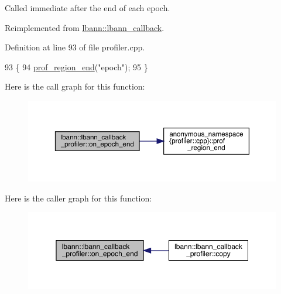 Called immediate after the end of each epoch. 

Reimplemented from \hyperlink{classlbann_1_1lbann__callback_a1fc71110e7f754bf73c9e0f344a448a5}{lbann\+::lbann\+\_\+callback}.



Definition at line 93 of file profiler.\+cpp.


\begin{DoxyCode}
93                                                    \{
94   \hyperlink{namespaceanonymous__namespace_02profiler_8cpp_03_a7984c26fb186307873a2f83f91715a99}{prof\_region\_end}(\textcolor{stringliteral}{"epoch"});
95 \}
\end{DoxyCode}
Here is the call graph for this function\+:\nopagebreak
\begin{figure}[H]
\begin{center}
\leavevmode
\includegraphics[width=350pt]{classlbann_1_1lbann__callback__profiler_a86e0fbe550ff42660766977604d9d5a6_cgraph}
\end{center}
\end{figure}
Here is the caller graph for this function\+:\nopagebreak
\begin{figure}[H]
\begin{center}
\leavevmode
\includegraphics[width=350pt]{classlbann_1_1lbann__callback__profiler_a86e0fbe550ff42660766977604d9d5a6_icgraph}
\end{center}
\end{figure}
\mbox{\label{classlbann_1_1lbann__callback__profiler_a027fe89a27c52ae80a1982f96dd62455}} 
